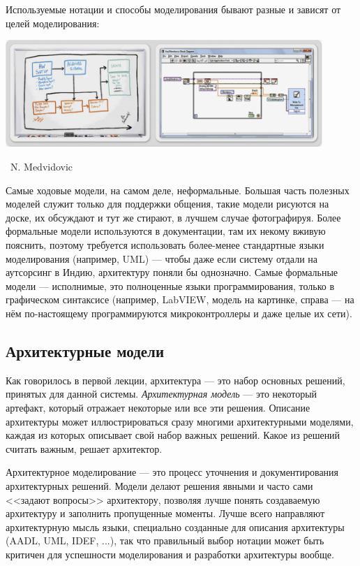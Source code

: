 \documentclass[a5paper]{article}
\newcommand{\attribution}[1] {
    \vspace{-5mm}\begin{flushright}\begin{scriptsize}%
    {\textcopyright\, #1}\end{scriptsize}\end{flushright}
}
\begin{document}
Используемые нотации и способы моделирования бывают разные и зависят от целей моделирования:

\begin{center}
    \includegraphics[width=0.9\textwidth]{sketchesVsFormalNotations.png}
    \attribution{N. Medvidovic}
\end{center}

Самые ходовые модели, на самом деле, неформальные. Большая часть полезных моделей служит только для поддержки общения, такие модели рисуются на доске, их обсуждают и тут же стирают, в лучшем случае фотографируя. Более формальные модели используются в документации, там их некому вживую пояснить, поэтому требуется использовать более-менее стандартные языки моделирования (например, UML) --- чтобы даже если систему отдали на аутсорсинг в Индию, архитектуру поняли бы однозначно. Самые формальные модели --- исполнимые, это полноценные языки программирования, только в графическом синтаксисе (например, LabVIEW, модель на картинке, справа --- на нём по-настоящему программируются микроконтроллеры и даже целые их сети).

\subsection{Архитектурные модели}

Как говорилось в первой лекции, архитектура --- это набор основных решений, принятых для данной системы. \textit{Архитектурная модель} --- это некоторый артефакт, который отражает некоторые или все эти решения. Описание архитектуры может иллюстрироваться сразу многими архитектурными моделями, каждая из которых описывает свой набор важных решений. Какое из решений считать важным, решает архитектор.

Архитектурное моделирование --- это процесс уточнения и документирования архитектурных решений. Модели делают решения явными и часто сами <<задают вопросы>> архитектору, позволяя лучше понять создаваемую архитектуру и заполнить пропущенные моменты. Лучше всего направляют архитектурную мысль языки, специально созданные для описания архитектуры (AADL, UML, IDEF, ...), так что правильный выбор нотации может быть критичен для успешности моделирования и разработки архитектуры вообще.
\end{document}
